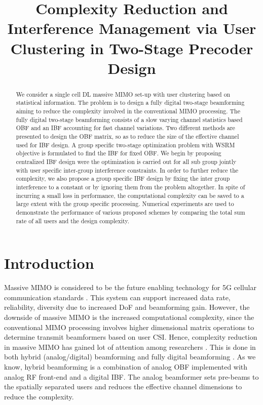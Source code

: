\documentclass[letterpaper,conference,10pt]{IEEEtran}
\title{Complexity Reduction and Interference Management via User Clustering in Two-Stage Precoder Design}
\author{\IEEEauthorblockN{Ayswarya Padmanabhan and Antti T\"{o}lli}%
	\IEEEauthorblockA{Centre for Wireless Communications (CWC), University of Oulu, Finland - FI-90014 \\
		Email: firstname.lastname@oulu.fi}}
\begin{document}
	\maketitle	
	
	\begin{abstract}
		We consider a single cell \ac{DL} massive \ac{MIMO} set-up with user clustering based on statistical information. The problem is to design a fully digital two-stage beamforming aiming to reduce the complexity involved in the conventional \ac{MIMO} processing. The fully digital two-stage beamforming consists of a slow varying channel statistics based \ac{OBF} and an \ac{IBF} accounting for fast channel variations. Two different methods are presented to design the \ac{OBF} matrix, so as to reduce the size of the effective channel used for \ac{IBF} design. A group specific two-stage optimization problem with \ac{WSRM} objective is formulated to find the \ac{IBF} for fixed \ac{OBF}. We begin by proposing centralized \ac{IBF} design were the optimization is carried out for all sub group jointly with user specific inter-group interference constraints. In order to further reduce the complexity, we also propose a group specific \ac{IBF} design by fixing the inter group interference to a constant or by ignoring them from the problem altogether. In spite of incurring a small loss in performance, the computational complexity can be saved to a large extent with the group specific processing. Numerical experiments are used to demonstrate the performance of various proposed schemes by comparing the total sum rate of all users and the design complexity. 
	\end{abstract}

	\acresetall
	
	\section{Introduction}
		Massive \ac{MIMO} is considered to be the future enabling technology for 5G cellular communication standards \cite{ marzetta2010noncooperative, rusek2013scaling, boccardi2014five}. This system can support increased data rate, reliability, diversity due to increased \ac{DoF} and beamforming gain. However, the downside of massive \ac{MIMO} is the increased computational complexity, since the conventional \ac{MIMO} processing involves higher dimensional matrix operations to determine transmit beamformers based on user \ac{CSI}. Hence, complexity reduction in massive \ac{MIMO} has gained lot of attention among researchers \cite{liang2014low,molisch2017hybrid,adhikary2013joint}. This is done in both hybrid (analog/digital) beamforming \cite{molisch2017hybrid} and fully digital beamforming \cite{adhikary2013joint}. As we know, hybrid beamforming is a combination of analog \ac{OBF} implemented with analog \ac{RF} front-end and a digital \ac{IBF}. The analog beamformer sets pre-beams to the spatially separated users and reduces the effective channel dimensions to reduce the complexity. 
		
\end{document}
